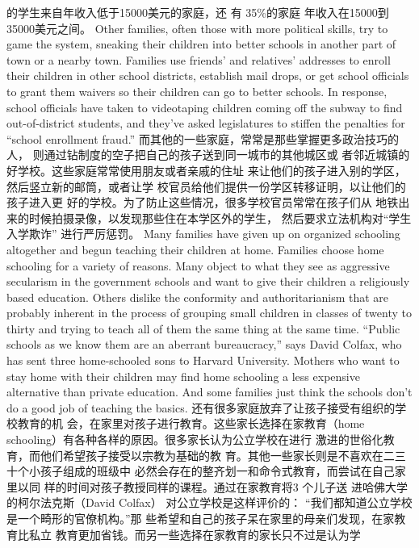 \begin{paracol}{2}
的学生来自年收入低于15000美元的家庭，还 有 35\%的家庭
年收入在15000到 35000美元之间。
\switchcolumn*
Other families, often those with more political skills, try to
game the system, sneaking their children into better schools in
another part of town or a nearby town. Families use friends' and
relatives' addresses to enroll their children in other school districts, establish mail drops, or get school officials to grant them
waivers so their children can go to better schools. In response, school officials have taken to videotaping children coming off
the subway to find out-of-district students, and they've asked
legislatures to stiffen the penalties for ``school enrollment
fraud.''
\switchcolumn
而其他的一些家庭，常常是那些掌握更多政治技巧的人，
则通过钻制度的空子把自己的孩子送到同一城市的其他城区或
者邻近城镇的好学校。这些家庭常常使用朋友或者亲戚的住址
来让他们的孩子进入别的学区，然后竖立新的邮筒，或者让学
校官员给他们提供一份学区转移证明，以让他们的孩子进入更
好的学校。为了防止这些情况，很多学校官员常常在孩子们从
地铁出来的时候拍摄录像，以发现那些住在本学区外的学生，
然后要求立法机构对“学生入学欺诈” 进行严厉惩罚。
\switchcolumn*
Many families have given up on organized schooling altogether and begun teaching their children at home. Families
choose home schooling for a variety of reasons. Many object to
what they see as aggressive secularism in the government
schools and want to give their children a religiously based education. Others dislike the conformity and authoritarianism that
are probably inherent in the process of grouping small children
in classes of twenty to thirty and trying to teach all of them the
same thing at the same time. ``Public schools as we know them
are an aberrant bureaucracy,'' says David Colfax, who has sent
three home-schooled sons to Harvard University. Mothers who
want to stay home with their children may find home schooling
a less expensive alternative than private education. And some
families just think the schools don't do a good job of teaching
the basics.
\switchcolumn
还有很多家庭放弃了让孩子接受有组织的学校教育的机
会，在家里对孩子进行教育。这些家长选择在家教育（home
schooling）有各种各样的原因。很多家长认为公立学校在进行
激进的世俗化教育，而他们希望孩子接受以宗教为基础的教
育。其他一些家长则是不喜欢在二三十个小孩子组成的班级中
必然会存在的整齐划一和命令式教育，而尝试在自己家里以同
样的时间对孩子教授同样的课程。通过在家教育将3 个儿子送
进哈佛大学的柯尔法克斯（David Colfax） 对公立学校是这样评价的： “我们都知道公立学校是一个畸形的官僚机构。”那
些希望和自己的孩子呆在家里的母亲们发现，在家教育比私立
教育更加省钱。而另一些选择在家教育的家长只不过是认为学

\end{paracol}
